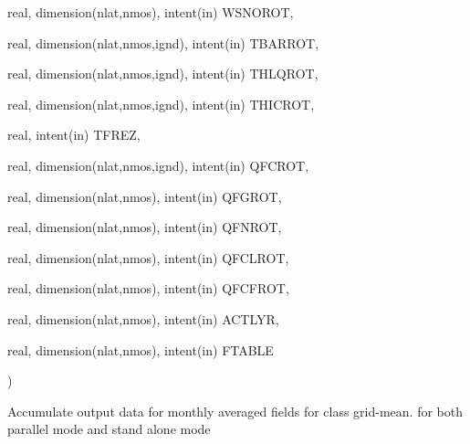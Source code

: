 {\begin{DoxyParamCaption}
\item[{real, dimension(nlat,nmos), intent(in)}]{W\+S\+N\+O\+R\+O\+T, }
\item[{real, dimension(nlat,nmos,ignd), intent(in)}]{T\+B\+A\+R\+R\+O\+T, }
\item[{real, dimension(nlat,nmos,ignd), intent(in)}]{T\+H\+L\+Q\+R\+O\+T, }
\item[{real, dimension(nlat,nmos,ignd), intent(in)}]{T\+H\+I\+C\+R\+O\+T, }
\item[{real, intent(in)}]{T\+F\+R\+E\+Z, }
\item[{real, dimension(nlat,nmos,ignd), intent(in)}]{Q\+F\+C\+R\+O\+T, }
\item[{real, dimension(nlat,nmos), intent(in)}]{Q\+F\+G\+R\+O\+T, }
\item[{real, dimension(nlat,nmos), intent(in)}]{Q\+F\+N\+R\+O\+T, }
\item[{real, dimension(nlat,nmos), intent(in)}]{Q\+F\+C\+L\+R\+O\+T, }
\item[{real, dimension(nlat,nmos), intent(in)}]{Q\+F\+C\+F\+R\+O\+T, }
\item[{real, dimension(nlat,nmos), intent(in)}]{A\+C\+T\+L\+Y\+R, }
\item[{real, dimension(nlat,nmos), intent(in)}]{F\+T\+A\+B\+L\+E}
\end{DoxyParamCaption}
)}\label{group__io__driver__class__monthly__aw_ga74bdc0fab9f9ccf2d9189b56a514ed6d}
Accumulate output data for monthly averaged fields for class grid-\/mean. for both parallel mode and stand alone mode 